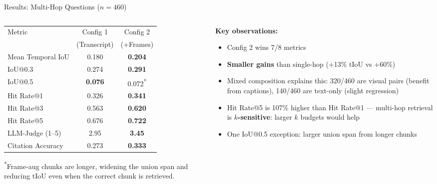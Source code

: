 \documentclass[aspectratio=169,t]{beamer}
\begin{document}
\begin{frame}{Results: Multi-Hop Questions ($n = 460$)}

\begin{columns}[T]
\begin{column}{0.52\textwidth}
  \small
  \begin{tabular}{lcc}
  \toprule
  Metric & Config 1 & Config 2 \\
         & (Transcript) & (+Frames) \\
  \midrule
  Mean Temporal IoU  & 0.180 & \textbf{0.204} \\
  IoU@0.3            & 0.274 & \textbf{0.291} \\
  IoU@0.5            & \textbf{0.076} & 0.072\textsuperscript{*} \\
  \midrule
  Hit Rate@1         & 0.326 & \textbf{0.341} \\
  Hit Rate@3         & 0.563 & \textbf{0.620} \\
  Hit Rate@5         & 0.676 & \textbf{0.722} \\
  \midrule
  LLM-Judge (1--5)   & 2.95  & \textbf{3.45} \\
  Citation Accuracy  & 0.273 & \textbf{0.333} \\
  \bottomrule
  \end{tabular}

  \footnotesize\textsuperscript{*}Frame-aug chunks are longer, widening the union
  span and reducing tIoU even when the correct chunk is retrieved.
\end{column}
\begin{column}{0.44\textwidth}
  \textbf{Key observations:}
  \begin{itemize}
    \item Config 2 wins 7/8 metrics
    \item \textbf{Smaller gains} than single-hop (+13\% tIoU vs +60\%)
    \item Mixed composition explains this: 320/460 are visual pairs (benefit from
          captions), 140/460 are text-only (slight regression)
    \item Hit Rate@5 is 107\% higher than Hit Rate@1 — multi-hop retrieval
          is \textbf{$k$-sensitive}: larger $k$ budgets would help
    \item One IoU@0.5 exception: larger union span from longer chunks
  \end{itemize}
\end{column}
\end{columns}

\end{frame}
\end{document}
